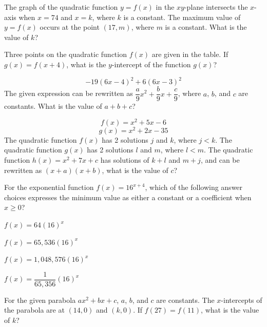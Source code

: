 \vfill
\noindent\begin{minipage}{\linewidth}
\par\smallskip
The graph of the quadratic function $y=f(x)$ in the $xy$-plane intersects the $x$-axis when $x=74$ and $x=k$, where $k$ is a constant. The maximum value of $y=f(x)$ occurs at the point $(17,m)$, where $m$ is a constant. What is the value of $k$?
\end{minipage}
\vfill
\clearpage
\noindent\begin{minipage}{\linewidth}
\par\smallskip
Three points on the quadratic function $f(x)$ are given in the table. If $g(x)=f(x+4)$, what is the $y$-intercept of the function $g(x)$?
\satfig{\figtblfxquad}
\end{minipage}
\vfill
\noindent\begin{minipage}{\linewidth}
\par\smallskip
$$-19(6x-4)^2+6(6x-3)^2$$ The given expression can be rewritten as $\dfrac{a}{9}x^2+\dfrac{b}{9}x+\dfrac{c}{9}$, where $a$, $b$, and $c$ are constants. What is the value of $a+b+c$?
\end{minipage}
\vfill
\noindent\begin{minipage}{\linewidth}
\par\smallskip
$$f(x)=x^2+5x-6$$ $$g(x)=x^2+2x-35$$ The quadratic function $f(x)$ has 2 solutions $j$ and $k$, where $j<k$. The quadratic function $g(x)$ has 2 solutions $l$ and $m$, where $l<m$. The quadratic function $h(x)=x^2+7x+c$ has solutions of $k+l$ and $m+j$, and can be rewritten as $(x+a)(x+b)$, what is the value of $c$?
\end{minipage}
\vfill
\clearpage
\noindent\begin{minipage}{\linewidth}
\par\smallskip
For the exponential function $f(x)=16^{x+4}$, which of the following answer choices expresses the minimum value as either a constant or a coefficient when $x\ge0$?
\begin{satchoices}
  \item[A)] $f(x)=64(16)^x$
  \item[B)] $f(x)=65{,}536(16)^x$
  \item[C)] $f(x)=1{,}048{,}576(16)^x$
  \item[D)] $f(x)=\dfrac{1}{65{,}356}(16)^x$
\end{satchoices}
\end{minipage}
\vfill
\noindent\begin{minipage}{\linewidth}
\par\smallskip
For the given parabola $ax^2+bx+c$, $a$, $b$, and $c$ are constants. The $x$-intercepts of the parabola are at $(14,0)$ and $(k,0)$. If $f(27)=f(11)$, what is the value of $k$?
\end{minipage}
